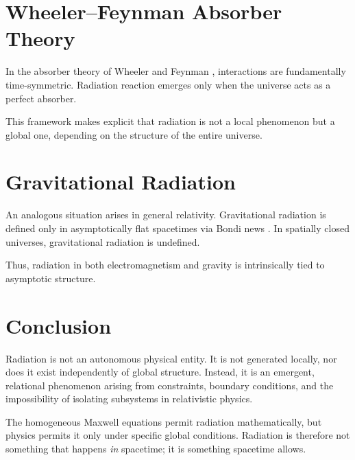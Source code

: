 \documentclass[11pt]{article}
\begin{document}
\section{Wheeler--Feynman Absorber Theory}

In the absorber theory of Wheeler and Feynman \cite{WheelerFeynman1945}, interactions are fundamentally time-symmetric. Radiation reaction emerges only when the universe acts as a perfect absorber.

This framework makes explicit that radiation is not a local phenomenon but a global one, depending on the structure of the entire universe.

\section{Gravitational Radiation}

An analogous situation arises in general relativity. Gravitational radiation is defined only in asymptotically flat spacetimes via Bondi news \cite{Bondi1962,AshtekarStreubel}. In spatially closed universes, gravitational radiation is undefined.

Thus, radiation in both electromagnetism and gravity is intrinsically tied to asymptotic structure.

\section{Conclusion}

Radiation is not an autonomous physical entity. It is not generated locally, nor does it exist independently of global structure. Instead, it is an emergent, relational phenomenon arising from constraints, boundary conditions, and the impossibility of isolating subsystems in relativistic physics.

The homogeneous Maxwell equations permit radiation mathematically, but physics permits it only under specific global conditions. Radiation is therefore not something that happens \emph{in} spacetime; it is something spacetime allows.
\end{document}
